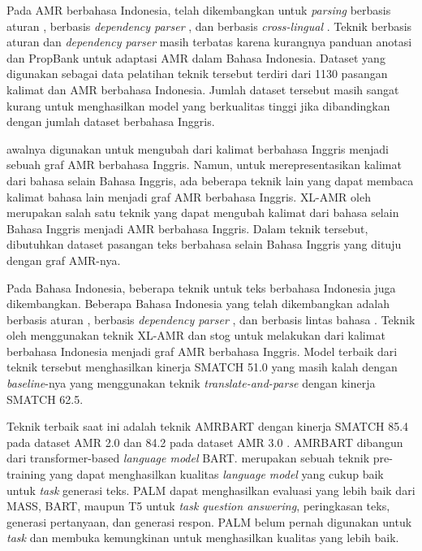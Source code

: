 Pada \gls{AMR} berbahasa Indonesia, telah dikembangkan untuk \textit{parsing} berbasis aturan , berbasis \textit{dependency parser} , dan berbasis \textit{cross-lingual} .
Teknik \amrparsing{} berbasis aturan dan \textit{dependency parser} masih terbatas karena kurangnya panduan anotasi dan PropBank untuk adaptasi \gls{AMR} dalam Bahasa Indonesia.
Dataset yang digunakan sebagai data pelatihan teknik tersebut terdiri dari 1130 pasangan kalimat dan AMR berbahasa Indonesia.
Jumlah dataset tersebut masih sangat kurang untuk menghasilkan model yang berkualitas tinggi jika dibandingkan dengan jumlah dataset berbahasa Inggris.

\amrparsing{} awalnya digunakan untuk mengubah dari kalimat berbahasa Inggris menjadi sebuah graf \gls{AMR} berbahasa Inggris.
Namun, untuk merepresentasikan kalimat dari bahasa selain Bahasa Inggris, ada beberapa teknik lain yang dapat membaca kalimat bahasa lain menjadi graf \gls{AMR} berbahasa Inggris.
\gls{XL-AMR} oleh \textcite{blloshmi2020} merupakan salah satu teknik yang dapat mengubah kalimat dari bahasa selain Bahasa Inggris menjadi \gls{AMR} berbahasa Inggris.
Dalam teknik tersebut, dibutuhkan dataset pasangan teks berbahasa selain Bahasa Inggris yang dituju dengan graf \gls{AMR}-nya.

Pada Bahasa Indonesia, beberapa teknik \amrparsing{} untuk teks berbahasa Indonesia juga dikembangkan.
Beberapa \amrparsing{} Bahasa Indonesia yang telah dikembangkan adalah \amrparsing{} berbasis aturan , berbasis \textit{dependency parser} , dan berbasis lintas bahasa .
Teknik \amrparsing{} oleh \textcite{putra2022} menggunakan teknik \gls{XL-AMR} dan stog untuk melakukan \amrparsing{} dari kalimat berbahasa Indonesia menjadi graf \gls{AMR} berbahasa Inggris.
Model terbaik dari teknik tersebut menghasilkan kinerja SMATCH 51.0 yang masih kalah dengan \textit{baseline}-nya yang menggunakan teknik \textit{translate-and-parse} dengan kinerja SMATCH 62.5.

Teknik \amrparsing{} terbaik saat ini adalah teknik AMRBART dengan kinerja SMATCH 85.4 pada dataset \gls{AMR} 2.0 dan 84.2 pada dataset \gls{AMR} 3.0 .
AMRBART dibangun dari transformer-based \textit{language model} \gls{BART}.
 merupakan sebuah teknik pre-training yang dapat menghasilkan kualitas \textit{language model} yang cukup baik untuk \textit{task} generasi teks.
\gls{PALM} dapat menghasilkan evaluasi yang lebih baik dari \gls{MASS}, \gls{BART}, maupun T5 untuk \textit{task} \textit{question answering}, peringkasan teks, generasi pertanyaan, dan generasi respon.
\gls{PALM} belum pernah digunakan untuk \textit{task} \amrparsing{} dan membuka kemungkinan untuk menghasilkan kualitas yang lebih baik.
